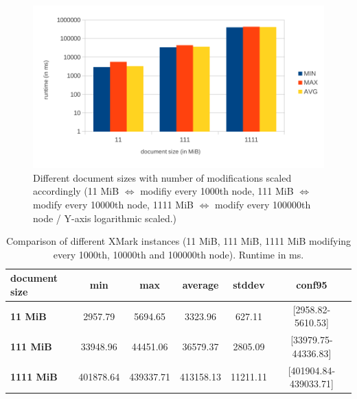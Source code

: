 \begin{figure}[tb]
\centering
\includegraphics[width=\textwidth]{figures/diff-docsize-scale}
\caption{Different document sizes with number of modifications scaled accordingly (11 MiB $\Leftrightarrow$ modifiy every 1000th node, 111 MiB $\Leftrightarrow$ modify every 10000th node, 1111 MiB $\Leftrightarrow$ modify every 100000th node / Y-axis logarithmic scaled.)} 
\label{fig:docScaling}
\end{figure}

\begin{table}[tb]
\centering 
\begin{tabular}[r]{|l|c|c|c|c|c|} 
\hline
\textbf{document size} & \textbf{min} & \textbf{max} & \textbf{average} & \textbf{stddev} & \textbf{conf95}\\
\hline
\hline
\textbf{11 MiB} & 2957.79 & 5694.65 & 3323.96 & 627.11 & [2958.82-5610.53]\\
\hline
\textbf{111 MiB} & 33948.96 & 44451.06 & 36579.37 & 2805.09 & [33979.75-44336.83]\\
\hline
\textbf{1111 MiB} & 401878.64 & 439337.71 & 413158.13 & 11211.11 & [401904.84-439033.71]\\
\hline
\end{tabular}
\label{chap3:compDiffInstances}
\vspace{0.5em} 
\caption{Comparison of different XMark instances (11 MiB, 111 MiB, 1111 MiB modifying every 1000th, 10000th and 100000th node). Runtime in ms.}
\end{table}


